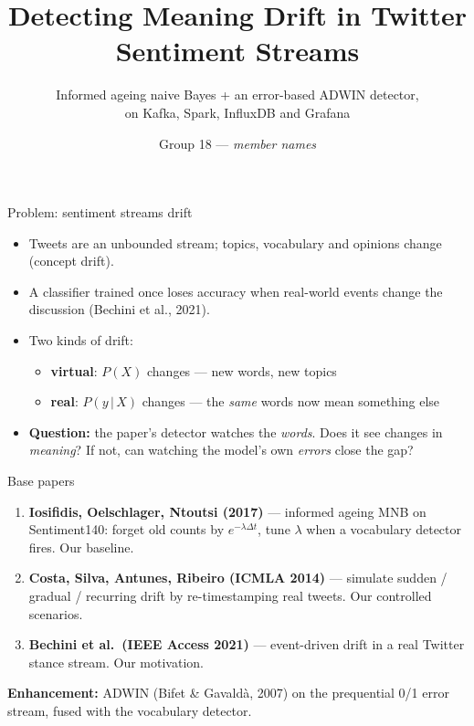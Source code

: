 \documentclass[aspectratio=169,10pt]{beamer}
\title{Detecting Meaning Drift in Twitter Sentiment Streams}
\subtitle{Informed ageing naive Bayes + an error-based ADWIN detector,\\on Kafka, Spark, InfluxDB and Grafana}
\author{Group 18 --- \textit{member names}}  %
\institute{Streaming Data Analysis, Semester 7}
\date{}
\begin{document}
\begin{frame}
\titlepage
\end{frame}

\begin{frame}{Problem: sentiment streams drift}
\begin{itemize}
\item Tweets are an unbounded stream; topics, vocabulary and opinions change (concept drift).
\item A classifier trained once loses accuracy when real-world events change the discussion
  (Bechini et al., 2021).
\item Two kinds of drift:
  \begin{itemize}
  \item \textbf{virtual}: $P(X)$ changes --- new words, new topics
  \item \textbf{real}: $P(y\,|\,X)$ changes --- the \emph{same} words now mean something else
  \end{itemize}
\item \textbf{Question:} the paper's detector watches the \emph{words}. Does it see changes in
  \emph{meaning}? If not, can watching the model's own \emph{errors} close the gap?
\end{itemize}
\end{frame}

\begin{frame}{Base papers}
\begin{enumerate}
\item \textbf{Iosifidis, Oelschlager, Ntoutsi (2017)} --- informed ageing MNB on Sentiment140:
  forget old counts by $e^{-\lambda \Delta t}$, tune $\lambda$ when a vocabulary detector fires.
  \alert{Our baseline.}
\item \textbf{Costa, Silva, Antunes, Ribeiro (ICMLA 2014)} --- simulate sudden / gradual /
  recurring drift by re-timestamping real tweets. \alert{Our controlled scenarios.}
\item \textbf{Bechini et al.\ (IEEE Access 2021)} --- event-driven drift in a real Twitter stance
  stream. \alert{Our motivation.}
\end{enumerate}
\vspace{1em}
\textbf{Enhancement:} ADWIN (Bifet \& Gavald\`a, 2007) on the prequential 0/1 error stream,
fused with the vocabulary detector.
\end{frame}
\end{document}
